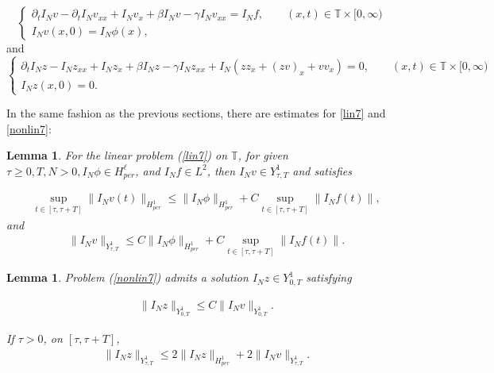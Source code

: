 \documentclass[10pt,a4paper,final]{article}
\numberwithin{equation}{section}
\newtheorem{lemma}[theorem]{Lemma}
\newcommand{\bT}{\mathbb{T}}
\begin{document}
\begin{equation} \label{lin7}
\begin{cases}
    \partial_t I_Nv-\partial_t I_Nv_{xx}+I_Nv_x+\beta I_Nv -\gamma I_Nv_{xx} = I_Nf, \quad\quad (x, t)\in \bT\times [0, \infty)&\\
    I_Nv(x,0)=I_N\phi(x), &
\end{cases}
\end{equation}
and 
\begin{equation}
\label{nonlin7}
\begin{cases}
\partial_t I_Nz-I_Nz_{xx}+I_Nz_x+\beta I_Nz -\gamma I_Nz_{xx}+I_N(zz_x+(zv)_x+vv_x) = 0, \quad\quad (x, t)\in \bT\times [0, \infty)&\\
I_Nz(x,0)=0.&
\end{cases}
\end{equation}

In the same fashion as the previous sections, there are estimates for \eqref{lin7} and \eqref{nonlin7}:\\

\begin{lemma}\label{le5-3}
For the linear problem (\ref{lin7}) on $\mathbb{T}$, for given $\tau\ge 0, T, N> 0, I_N\phi\in H_{per}^\ell$, and $I_N f\in L^2$, then $I_Nv\in Y^1_{\tau, T}$ and satisfies

\begin{eqnarray*}
\sup_{t\in{[\tau, \tau+T]}}\|I_Nv(t)\|_{H_{per}^1}\le \|I_N\phi\|_{H_{per}^1} + C\sup_{t\in{[\tau, \tau+T]}}\|I_Nf(t)\|, 
\end{eqnarray*} and 
\begin{eqnarray*}
\|I_Nv\|_{Y^1_{\tau, T}}\le C\|I_N\phi\|_{H_{per}^1} + C\sup_{t\in [\tau, \tau+T]}\|I_N f(t)\|. 
\end{eqnarray*}
\end{lemma}

\begin{lemma}\label{le5-4}
Problem (\ref{nonlin7}) admits a solution $I_Nz\in Y^1_{0, T}$ satisfying

\begin{eqnarray}
\|I_Nz\|_{Y^1_{0, T}}\le C\|I_Nv\|_{Y^1_{0, T}}.
\end{eqnarray} 

If $\tau>0$, on $[\tau, \tau+T]$,
\begin{eqnarray}\label{3-7}
\|I_Nz\|_{Y^1_{\tau, T}}\le 2\|I_Nz\|_{H_{per}^1} + 2\|I_Nv\|_{Y^1_{\tau, T}}.
\end{eqnarray}
\end{lemma}
\end{document}

